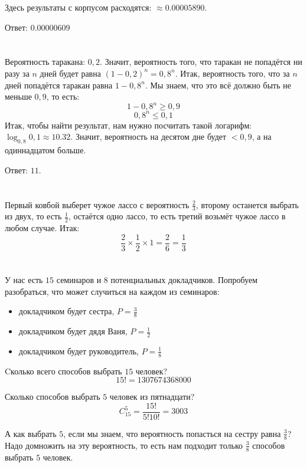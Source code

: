 \documentclass[a4paper,10pt]{article}
\begin{document}
Здесь результаты с корпусом расходятся: $\approx 0.00005890$.

Ответ: $0.00000609$

\section{}
Вероятность таракана: $0,2$. Значит, вероятность того, что таракан не попадётся ни разу за $n$ дней будет равна $(1 - 0,2)^n = 0,8^n$. Итак, вероятность того, что за $n$ дней попадётся таракан равна $1 - 0,8^n$. Мы знаем, что это всё должно быть не меньше $0,9$, то есть:
$$ 1 - 0,8^n \geqslant 0,9$$
$$ 0,8^n \leqslant 0,1 $$
Итак, чтобы найти результат, нам нужно посчитать такой логарифм:
$ \log_{0,8} 0,1 \approx 10.32 $. Значит, вероятность на десятом дне будет $<0,9$,
а на одиннадцатом больше.

Ответ: $11$.

\section{}
Первый ковбой выберет чужое лассо с вероятность $\frac{2}{3}$, второму останется выбрать из двух, то есть $\frac{1}{2}$, остаётся одно лассо, то есть третий возьмёт чужое лассо в любом случае. Итак:
$$ \frac{2}{3} \times \frac{1}{2} \times 1 = \frac{2}{6} = \frac{1}{3} $$

\section{}
У нас есть $15$ семинаров и $8$ потенциальных докладчиков. Попробуем разобраться, что может случиться на каждом из семинаров:
\begin{itemize}
 \item докладчиком будет сестра, $P = \frac{3}{8}$
 \item докладчиком будет дядя Ваня, $P = \frac{1}{2}$
 \item докладчиком будет руководитель, $P = \frac{1}{8}$
\end{itemize}

Cколько всего способов выбрать $15$ человек?
$$ 15! = 1 307 674 368 000 $$

Сколько способов выбрать $5$ человек из пятнадцати?
$$ C_{15}^5 = \frac{15!}{5!10!} = 3003 $$

А как выбрать $5$, если мы знаем, что вероятность попасться на сестру
равна $\frac{3}{8}$? Надо домножить на эту вероятность, то есть нам подходит только $\frac{3}{8}$ способов выбрать $5$ человек.
\end{document}
